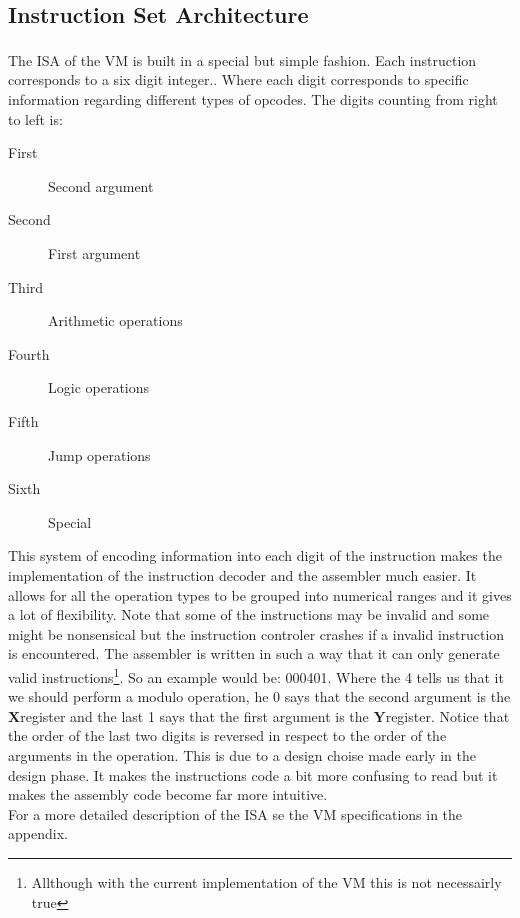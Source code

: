 \documentclass{article}
\newcommand{\x}{$\textbf{X}$}
\newcommand{\y}{$\textbf{Y}$}
\begin{document}
\subsection{Instruction Set Architecture}
The ISA\textsuperscript{\cite{ISA}} of the VM is built in a special but simple
fashion. Each instruction corresponds to a six digit integer..
Where each digit corresponds to specific information regarding different types of opcodes. The digits counting from right
to left is: 

\begin{description}
  \item[First] Second argument
  \item[Second] First argument
  \item[Third] Arithmetic operations
  \item[Fourth] Logic operations
  \item[Fifth] Jump operations
  \item[Sixth] Special
\end{description}
This system of encoding information into each digit of the instruction makes the
implementation of the instruction decoder and the assembler much easier. It
allows for all the operation types to be grouped into numerical ranges and it
gives  a lot of flexibility. Note that some of the instructions may be invalid
and some might be nonsensical but the instruction controler crashes if a invalid
instruction is encountered. The assembler is written in such a way that it can
only generate valid instructions\footnote{Allthough with the current
implementation of  the VM this is not necessairly true}.
So an example would be:
000401.
Where the 4 tells us that it we should perform a modulo operation, 
he 0 says that the second argument is the \x register and the last 1 says 
that the first argument is the \y register. Notice that the order of
the last two digits is reversed in respect to the order of the arguments in
the operation.
This is due to a design choise made early in the design phase. It makes the
instructions code a bit more confusing to read but it makes the assembly code
become far more intuitive.\\
For a more detailed description of the ISA se the VM specifications in the
appendix.
\end{document}
